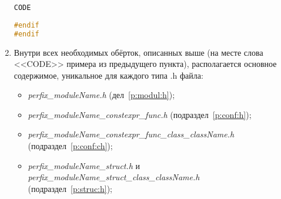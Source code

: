 \begin{enumerate}
\begin{lstlisting}[language=C++, frame=tlBR, basicstyle=\fontsize{10}{10}\ttfamily]
CODE
	
#endif
#endif
 \end{lstlisting}
	\item Внутри всех необходимых обёрток, описанных выше (на месте слова <<CODE>> примера из предыдущего пункта), располагается основное содержимое, уникальное для каждого типа .h файла:\begin{itemize}
		\item \textit{perfix\_moduleName.h} (дел~\ref{p:modul:h});
		\item \textit{perfix\_moduleName\_constexpr\_func.h} (подраздел~\ref{p:conf:h});
		\item \textit{perfix\-\_moduleName\-\_constexpr\-\_func\-\_class\-\_className.h} (подраздел~\ref{p:conf:ch});
		\item \textit{perfix\_moduleName\_struct.h} и \textit{perfix\-\_moduleName\-\_struct\-\_class\-\_class\-Name.h}\\(подраздел~\ref{p:struc:h});
	\end{itemize}
\end{enumerate}

